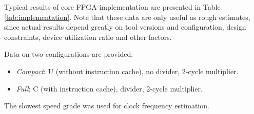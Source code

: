 \documentclass[a4paper,12pt,twoside,extrafontsizes]{memoir}
\begin{document}
Typical results of \lxp{} core FPGA implementation are presented in Table \ref{tab:implementation}. Note that these data are only useful as rough estimates, since actual results depend greatly on tool versions and configuration, design constraints, device utilization ratio and other factors.

Data on two configurations are provided:

\begin{itemize}
	\item \emph{Compact}: \lxp{}U (without instruction cache), no divider, 2-cycle multiplier.
	\item \emph{Full}: \lxp{}C (with instruction cache), divider, 2-cycle multiplier.
\end{itemize}

The slowest speed grade was used for clock frequency estimation.
\end{document}
